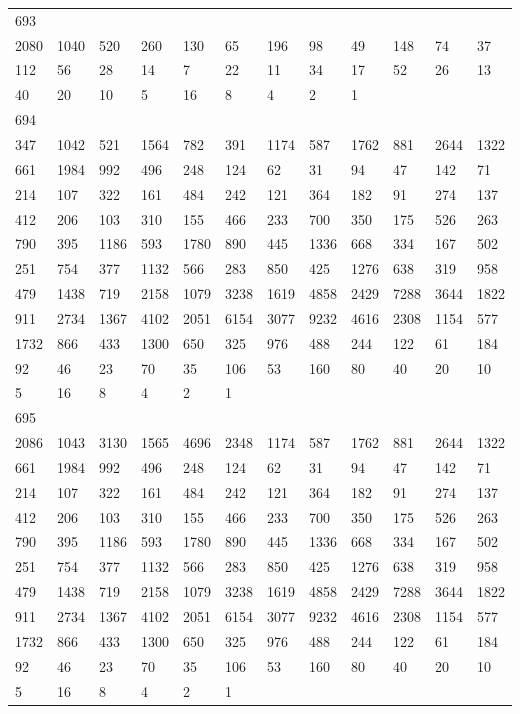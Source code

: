 \begin{longtable}{llllllllllll}
693&&&&&&&&&&&\\
2080& 1040& 520& 260& 130& 65& 196& 98& 49& 148& 74& 37\\
112& 56& 28& 14& 7& 22& 11& 34& 17& 52& 26& 13\\
40& 20& 10& 5& 16& 8& 4& 2& 1& \\

694&&&&&&&&&&&\\
347& 1042& 521& 1564& 782& 391& 1174& 587& 1762& 881& 2644& 1322\\
661& 1984& 992& 496& 248& 124& 62& 31& 94& 47& 142& 71\\
214& 107& 322& 161& 484& 242& 121& 364& 182& 91& 274& 137\\
412& 206& 103& 310& 155& 466& 233& 700& 350& 175& 526& 263\\
790& 395& 1186& 593& 1780& 890& 445& 1336& 668& 334& 167& 502\\
251& 754& 377& 1132& 566& 283& 850& 425& 1276& 638& 319& 958\\
479& 1438& 719& 2158& 1079& 3238& 1619& 4858& 2429& 7288& 3644& 1822\\
911& 2734& 1367& 4102& 2051& 6154& 3077& 9232& 4616& 2308& 1154& 577\\
1732& 866& 433& 1300& 650& 325& 976& 488& 244& 122& 61& 184\\
92& 46& 23& 70& 35& 106& 53& 160& 80& 40& 20& 10\\
5& 16& 8& 4& 2& 1& \\

695&&&&&&&&&&&\\
2086& 1043& 3130& 1565& 4696& 2348& 1174& 587& 1762& 881& 2644& 1322\\
661& 1984& 992& 496& 248& 124& 62& 31& 94& 47& 142& 71\\
214& 107& 322& 161& 484& 242& 121& 364& 182& 91& 274& 137\\
412& 206& 103& 310& 155& 466& 233& 700& 350& 175& 526& 263\\
790& 395& 1186& 593& 1780& 890& 445& 1336& 668& 334& 167& 502\\
251& 754& 377& 1132& 566& 283& 850& 425& 1276& 638& 319& 958\\
479& 1438& 719& 2158& 1079& 3238& 1619& 4858& 2429& 7288& 3644& 1822\\
911& 2734& 1367& 4102& 2051& 6154& 3077& 9232& 4616& 2308& 1154& 577\\
1732& 866& 433& 1300& 650& 325& 976& 488& 244& 122& 61& 184\\
92& 46& 23& 70& 35& 106& 53& 160& 80& 40& 20& 10\\
5& 16& 8& 4& 2& 1& \\


\end{longtable}
